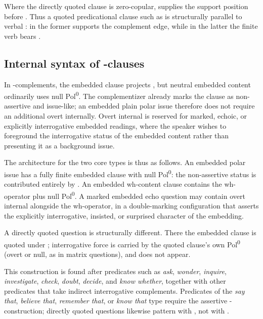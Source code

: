 Where the directly quoted clause is zero-copular,  supplies the support
position before . Thus a quoted predicational clause such as
 is structurally parallel to verbal
: in the former  supports the complement edge,
while in the latter the finite verb bears .

\subsection{Internal syntax of -clauses}

In -complements, the embedded clause projects , but
neutral embedded content ordinarily uses null Pol\textsuperscript{0}. The
complementizer  already marks the clause as non-assertive and
issue-like; an embedded plain polar issue therefore does not require an
additional overt  internally. Overt internal  is reserved for
marked, echoic, or explicitly interrogative embedded readings, where the speaker
wishes to foreground the interrogative status of the embedded content rather
than presenting it as a background issue.

The architecture for the two core types is thus as follows. An embedded polar
issue has a fully finite embedded clause with null Pol\textsuperscript{0}: the
non-assertive status is contributed entirely by . An embedded
wh-content clause contains the wh-operator plus null Pol\textsuperscript{0}. A
marked embedded echo question may contain overt internal  alongside the
wh-operator, in a double-marking configuration that asserts the explicitly
interrogative, insisted, or surprised character of the embedding.

A directly quoted question is structurally different. There the
embedded clause is quoted under ; interrogative force is carried by the
quoted clause's own Pol\textsuperscript{0} (overt  or null, as in
matrix questions), and  does not appear.

This construction is found after predicates such as \textit{ask},
\textit{wonder}, \textit{inquire}, \textit{investigate}, \textit{check},
\textit{doubt}, \textit{decide}, and \textit{know whether}, together with other
predicates that take indirect interrogative complements. Predicates of the
\textit{say that}, \textit{believe that}, \textit{remember that}, or
\textit{know that} type require the assertive -construction; directly
quoted questions likewise pattern with , not with .

